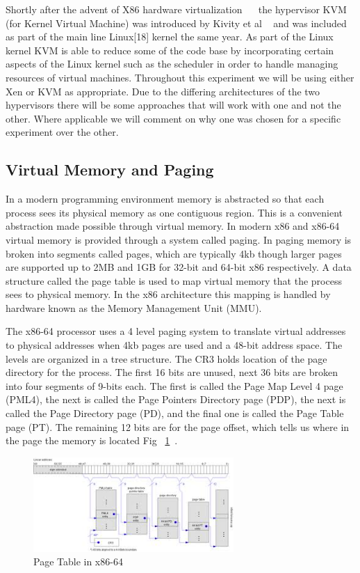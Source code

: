 Shortly after the advent of X86 hardware virtualization ~\cite{neiger_intel_2006}~\cite{codenamed_pacifica_2005} the hypervisor KVM (for Kernel Virtual Machine) was introduced by Kivity et al ~\cite{kivity_kvm:_2007} and was included as part of the main line Linux[18] kernel the same year. As part of the Linux kernel KVM is able to reduce some of the code base by incorporating certain aspects of the Linux kernel such as the scheduler in order to handle managing resources of virtual machines.  Throughout this experiment we will be using either Xen or KVM as appropriate. Due to the differing architectures of the two hypervisors there will be some approaches that will work with one and not the other. Where applicable we will comment on why one was chosen for a specific experiment over the other.

\subsection{Virtual Memory and Paging}

In a modern programming environment memory is abstracted so that each process sees its physical memory as one contiguous region.  This is a convenient abstraction made possible through virtual memory. In modern x86 and x86-64 virtual memory is provided through a system called paging. In paging memory is broken into segments called pages, which are typically 4kb though larger pages are supported up to 2MB and 1GB for 32-bit and 64-bit x86 respectively. A data structure called the page table is used to map virtual memory that the process sees to physical memory. In the x86 architecture this mapping is handled by hardware known as the Memory Management Unit (MMU). 

The x86-64 processor uses a 4 level paging system to translate virtual addresses to physical addresses when 4kb pages are used and a 48-bit address space. The levels are organized in a tree structure. The CR3 holds location of the page directory for the process. The first 16 bits are unused, next 36 bits are broken into four segments of 9-bits each. The first is called the Page Map Level 4 page (PML4), the next is called the Page Pointers Directory page (PDP), the next is called the Page Directory page (PD), and the final one is called the Page Table page (PT). The remaining 12 bits are for the page offset, which tells us where in the page the memory is located Fig ~\ref{VirtPaging}~\cite{_file:x86_2009}. 

\begin{figure}\label{VirtPaging}
	  \centering
	  \includegraphics[width=3in]{figures/PageTableDiagram.jpeg}
	  \caption{Page Table in x86-64 }
\end{figure}

